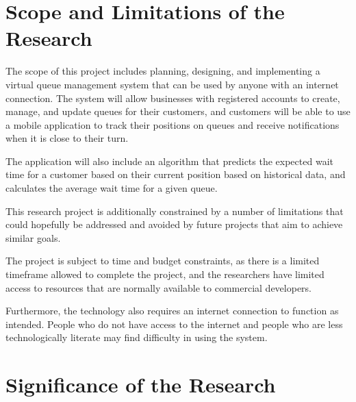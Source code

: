 \section{Scope and Limitations of the Research}
\label{sec:scopelimitations}

The scope of this project includes planning, designing, and implementing a virtual queue management system that can be used by anyone with an internet connection.
The system will allow businesses with registered accounts to create, manage, and update queues for their customers, and customers will be able to use a mobile application to track their positions on queues and receive notifications when it is close to their turn.

The application will also include an algorithm that predicts the expected wait time for a customer based on their current position based on historical data, and calculates the average wait time for a given queue.

This research project is additionally constrained by a number of limitations that could hopefully be addressed and avoided by future projects that aim to achieve similar goals. 

The project is subject to time and budget constraints, as there is a limited timeframe allowed to complete the project, and the researchers have limited access to resources that are normally available to commercial developers.

Furthermore, the technology also requires an internet connection to function as intended. People who do not have access to the internet and people who are less technologically literate may find difficulty in using the system.


\begin{comment}

%
%
Generally, one paragraph should be allotted for each of your research objectives.

Each paragraph contains a brief overview of the concept/theory and the purpose of doing the associated objective.

Each paragraph also includes a description of the scope/limitation of your study.

* Please refer to the slides for examples.

\end{comment}


\section{Significance of the Research}
\label{sec:significance}

